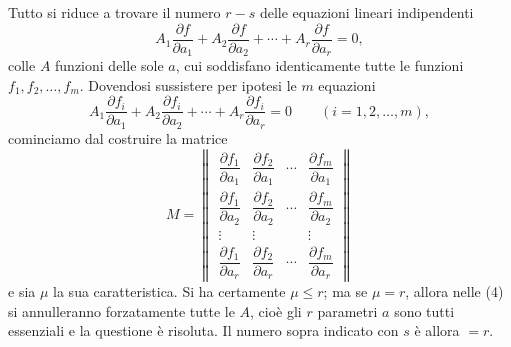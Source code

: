 \documentclass[11pt]{book}
\begin{document}
Tutto si riduce a trovare il numero $r-s$ delle equazioni lineari indipendenti
\[
 A_1\frac{\partial f}{\partial a_1}+A_2\frac{\partial f}{\partial a_2}+\cdots+A_r\frac{\partial f}{\partial a_r}=0,
\]
colle $A$ funzioni delle sole $a$, cui soddisfano identicamente tutte le funzioni $f_1,f_2,\ldots,f_m$. Dovendosi sussistere per ipotesi le $m$ equazioni
\begin{equation*}\tag{4}
 A_1\frac{\partial f_i}{\partial a_1}+A_2\frac{\partial f_i}{\partial a_2}+\cdots+A_r\frac{\partial f_i}{\partial a_r}=0\qquad (i=1,2,\ldots,m),
\end{equation*}
cominciamo dal costruire la matrice
\[
M=\left\|\begin{array}{cccc}
\dfrac{\partial f_1}{\partial a_1} & \dfrac{\partial f_2}{\partial a_1} & \cdots & \dfrac{\partial f_m}{\partial a_1}\\[0.65em]
\dfrac{\partial f_1}{\partial a_2} & \dfrac{\partial f_2}{\partial a_2} & \cdots & \dfrac{\partial f_m}{\partial a_2}\\
\vdots & \vdots & & \vdots\\
\dfrac{\partial f_1}{\partial a_r} & \dfrac{\partial f_2}{\partial a_r} & \cdots & \dfrac{\partial f_m}{\partial a_r}
\end{array}\right\|
\]
e sia $\mu$ la sua caratteristica. Si ha certamente $\mu\le r$; ma se $\mu=r$, allora nelle (4) si annulleranno forzatamente tutte le $A$, cioè gli $r$ parametri $a$ sono tutti essenziali e la questione è risoluta. Il numero sopra indicato con $s$ è allora $=r$.
\end{document}
